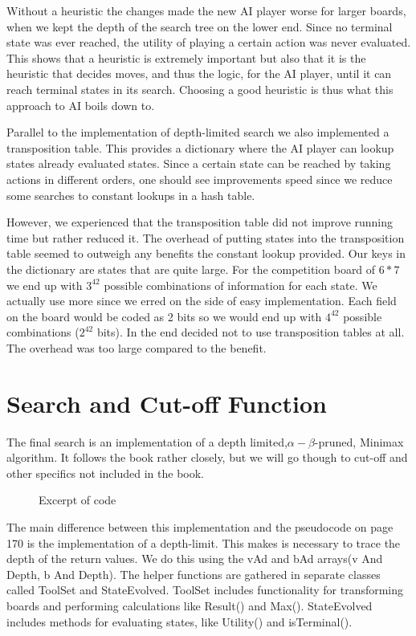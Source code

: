 \documentclass[11pt, a4paper]{article}
\begin{document}
Without a heuristic the changes made the new AI player worse for larger boards,
when we kept the depth of the search tree on the lower end. Since no terminal
state was ever reached, the utility of playing a certain action was never
evaluated. This shows that a heuristic is extremely important but also that it
is the heuristic that decides moves, and thus the logic, for the AI player,
until it can reach terminal states in its search. Choosing a good heuristic is
thus what this approach to AI boils down to.

Parallel to the implementation of depth-limited search we also implemented a
transposition table. This provides a dictionary where the AI player can lookup
states already evaluated states. Since a certain state can be reached by taking
actions in different orders, one should see improvements speed since we
reduce some searches to constant lookups in a hash table.

However, we experienced that the transposition table did not improve running
time but rather reduced it. The overhead of putting states into the
transposition table seemed to outweigh any benefits the constant lookup
provided. Our keys in the dictionary are states that are quite large. For the
competition board of $6*7$ we end up with $3^{42}$ possible combinations
of information for each state. We actually use more since we erred on the side
of easy implementation. Each field on the board would be coded as 2 bits so we would end up
with $4^{42}$ possible combinations ($2^{42}$ bits). In the end decided not to use transposition tables at all. The overhead was too large compared to the benefit. 

\section*{Search and Cut-off Function}

The final search is an implementation of a depth limited,$\alpha-\beta$-pruned, Minimax algorithm. It follows the book rather closely, but we will go though to cut-off and other specifics not included in the book.

\begin{figure}

\caption{ Excerpt of code}\label{MinimaxAB}
\end{figure}

The main difference between this implementation and the pseudocode on page 170 is the implementation of a depth-limit. This makes is necessary to trace the depth of the return values. We do this using the vAd and bAd arrays(v And Depth, b And Depth). The helper functions are gathered in separate classes called ToolSet and StateEvolved. ToolSet includes functionality for transforming boards and performing calculations like Result() and Max(). StateEvolved includes methods for evaluating states, like Utility() and isTerminal().
\end{document}
